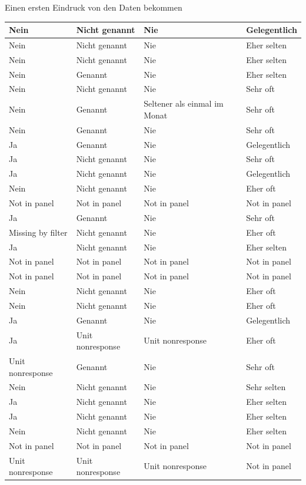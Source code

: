 \documentclass[ignorenonframetext,]{beamer}
\begin{document}
\begin{frame}{Einen ersten Eindruck von den Daten bekommen}
\begin{tabular}{l|l|l|l}
\hline
Nein & Nicht genannt & Nie & Gelegentlich\\
\hline
Nein & Nicht genannt & Nie & Eher selten\\
\hline
Nein & Nicht genannt & Nie & Eher selten\\
\hline
Nein & Genannt & Nie & Eher selten\\
\hline
Nein & Nicht genannt & Nie & Sehr oft\\
\hline
Nein & Genannt & Seltener als einmal im Monat & Sehr oft\\
\hline
Nein & Genannt & Nie & Sehr oft\\
\hline
Ja & Genannt & Nie & Gelegentlich\\
\hline
Ja & Nicht genannt & Nie & Sehr oft\\
\hline
Ja & Nicht genannt & Nie & Gelegentlich\\
\hline
Nein & Nicht genannt & Nie & Eher oft\\
\hline
Not in panel & Not in panel & Not in panel & Not in panel\\
\hline
Ja & Genannt & Nie & Sehr oft\\
\hline
Missing by filter & Nicht genannt & Nie & Eher oft\\
\hline
Ja & Nicht genannt & Nie & Eher selten\\
\hline
Not in panel & Not in panel & Not in panel & Not in panel\\
\hline
Not in panel & Not in panel & Not in panel & Not in panel\\
\hline
Nein & Nicht genannt & Nie & Eher oft\\
\hline
Nein & Nicht genannt & Nie & Eher oft\\
\hline
Ja & Genannt & Nie & Gelegentlich\\
\hline
Ja & Unit nonresponse & Unit nonresponse & Eher oft\\
\hline
Unit nonresponse & Genannt & Nie & Sehr oft\\
\hline
Nein & Nicht genannt & Nie & Sehr selten\\
\hline
Ja & Nicht genannt & Nie & Eher selten\\
\hline
Ja & Nicht genannt & Nie & Eher selten\\
\hline
Nein & Nicht genannt & Nie & Eher selten\\
\hline
Not in panel & Not in panel & Not in panel & Not in panel\\
\hline
Unit nonresponse & Unit nonresponse & Unit nonresponse & Not in panel\\
\hline

\end{tabular}
\end{frame}
\end{document}
